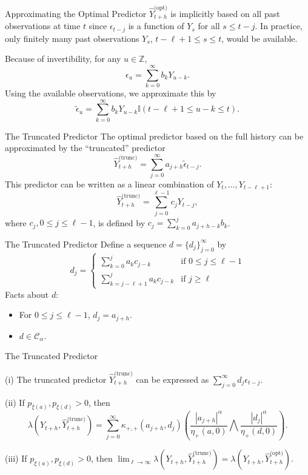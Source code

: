 \documentclass{beamer}
\def\I{\mathbb I}
\def\Z{{\mathbb Z}}
\def\seqSet{\mathcal{C}_{\alpha}}
\def\series{\xi}
\newcommand{\mmultiplier}[4]{\kappa_{#1, #2}(#3, #4)}
\newcommand{\normConst}[3]{\eta_{#1}({#2}, {#3})}
\newcommand{\pred}[1]{\hat{Y}_{t + h}^{\text{(#1)}}}
\begin{document}
\begin{frame}{Approximating the Optimal Predictor}
    $\pred{opt}$ is implicitly based on all past observations at time $t$ since $\epsilon_{t - j}$ is a function of $Y_s$ for all $s \le t - j$. In practice, only finitely many past observations $Y_s$, $t - \ell + 1 \le s \le t$, would be available.

    \medskip
    
    Because of invertibility, for any $u \in \Z$,
    \[
    \epsilon_u = \sum_{k = 0}^{\infty} b_k Y_{u - k}.
    \]
    Using the available observations, we approximate this by
    \[
    \tilde{\epsilon}_u = \sum_{k = 0}^{\infty} b_k Y_{u - k}\I(t - \ell + 1 \le u - k \le t).
    \]
\end{frame}

\begin{frame}{The Truncated Predictor}
    The optimal predictor based on the full history can be approximated by the ``truncated'' predictor
    \[
    \pred{trunc} = \sum_{j = 0}^{\infty} a_{j + h}\tilde{\epsilon}_{t - j}.
    \]
    This predictor can be written as a linear combination of $Y_t, \ldots, Y_{t - \ell + 1}$:
    \[
    \pred{trunc} = \sum_{j = 0}^{\ell - 1} c_j Y_{t - j},
    \]
    where $c_j, 0 \le j \le \ell - 1$, is defined by $c_j = \sum_{k = 0}^j a_{j + h - k}b_k$.
\end{frame}

\begin{frame}{The Truncated Predictor}
    Define a sequence $d = \{d_j\}_{j = 0}^{\infty}$ by
    \[
    d_j =
    \begin{cases}
        \sum_{k = 0}^j a_k c_{j - k} & \text{if $0 \le j \le \ell - 1$} \\
        \sum_{k = j - \ell + 1}^j a_k c_{j - k} & \text{if $j \ge \ell$}
    \end{cases}
    \]
    Facts about $d$:
    \begin{itemize}
        \item For $0 \le j \le \ell - 1$, $d_j = a_{j + h}$.
        \item $d \in \seqSet$.
    \end{itemize}
\end{frame}

\begin{frame}{The Truncated Predictor}
    \begin{theorem}
        (i) The truncated predictor $\pred{trunc}$ can be expressed as $\sum_{j = 0}^{\infty} d_j\epsilon_{t - j}$.
    
        (ii) If $p_{\series(a)}, p_{\series(d)} > 0$, then
        \[
         \lambda(Y_{t + h}, \pred{trunc}) = \sum_{j = 0}^{\infty} \mmultiplier{+}{+}{a_{j + h}}{d_j}\left(\frac{|a_{j + h}|^{\alpha}}{\normConst{+}{a}{0}} \bigwedge \frac{|d_j|^{\alpha}}{\normConst{+}{d}{0}}\right).
        \]
    
        (iii) If $p_{\series(a)}, p_{\series(d)} > 0$, then $\lim_{\ell \to \infty} \lambda(Y_{t + h}, \pred{trunc}) = \lambda(Y_{t + h}, \pred{opt})$.
    \end{theorem}
\end{frame}
\end{document}
